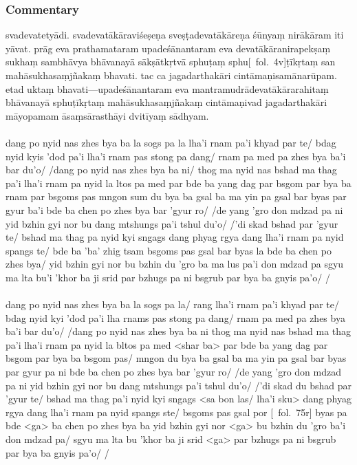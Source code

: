 \documentclass[12pt]{article}
\newcommand{\emdash} {\hspace{0em}—\hspace{0em}}
\begin{document}
\subsubsection{Commentary}
svadevatetyādi.
svadevatākāraviśeṣeṇa\footnoteB{
	svadevatā°] \sigmareading{\TVA}; lha \TVA\ (devatā°)
} sveṣṭadevatākāreṇa śūnyaṃ nirākāram iti yāvat.
prāg eva prathamataram\footnoteB{
	prathamataram] \MS ; prathamataro° \EDD
} upadeśānantaram\footnoteB{
	upadeśānantaram] \EDD\ (\emd); upadeśāntaram \MS
} eva devatākāranirapekṣaṃ sukhaṃ sambhāvya bhāvanayā sākṣātkṛtvā sphuṭaṃ\footnoteB{
	sphuṭaṃ] \MS ; \emph{deest in} \EDD ; ma gsal ba TIB 
} sphu[\MS\ fol.\ 4v]\hspace{0em}ṭīkṛtaṃ san mahāsukhasaṃjñakaṃ bhavati.
tac ca jagadarthakāri cintāmaṇisamānarūpam.
etad uktaṃ bhavati\emdash upadeśānantaram eva mantramudrādevatākārarahitaṃ\footnoteB{
	°rahitaṃ] \sigmareading{\TVA}; spangs te/ bde ba 'ba' zhig tsam \TVA\ (°rahitaṃ sukhamātraṃ)
} bhāvanayā sphuṭīkṛtaṃ mahāsukhasaṃjñakaṃ cintāmaṇivad jagadarthakāri māyopamam āsaṃsārasthāyi dvitīyaṃ sādhyam.\\

\textbf{\TVA}\\
dang po nyid nas zhes bya ba la sogs pa la lha'i rnam pa'i khyad par te/ bdag nyid kyis 'dod pa'i lha'i rnam pas stong pa dang/ rnam pa med pa zhes bya ba'i bar du'o/ /dang po nyid nas zhes bya ba ni/ thog ma nyid nas bshad ma thag pa'i lha'i rnam pa nyid la ltos pa med par bde ba yang dag par bsgom par bya ba rnam par bsgoms pas mngon sum du bya ba gsal ba ma yin pa gsal bar byas par gyur ba'i bde ba chen po zhes bya bar 'gyur ro/ /de yang 'gro don mdzad pa ni yid bzhin gyi nor bu dang mtshungs pa'i tshul du'o/ /'di skad bshad par 'gyur te/ bshad ma thag pa nyid kyi sngags dang phyag rgya dang lha'i rnam pa nyid spangs te/ bde ba 'ba' zhig tsam bsgoms pas gsal bar byas la bde ba chen po zhes bya/ yid bzhin gyi nor bu bzhin du 'gro ba ma lus pa'i don mdzad pa sgyu ma lta bu'i 'khor ba ji srid par bzhugs pa ni bsgrub par bya ba gnyis pa'o/ /\\

\textbf{\TVB}\\
dang po nyid nas zhes bya ba la sogs pa la/ rang lha'i rnam pa'i khyad par te/ bdag nyid kyi 'dod pa'i lha rnams pas stong pa dang/ rnam pa med pa zhes bya ba'i bar du'o/ /dang po nyid nas zhes bya ba ni thog ma nyid nas bshad ma thag pa'i lha'i rnam pa nyid la bltos pa med <shar ba> par bde ba yang dag par bsgom par bya ba bsgom pas/ mngon du bya ba gsal ba ma yin pa gsal bar byas par gyur pa ni bde ba chen po zhes bya bar 'gyur ro/ /de yang 'gro don mdzad pa ni yid bzhin gyi nor bu dang mtshungs pa'i tshul du'o/ /'di skad du bshad par 'gyur te/ bshad ma thag pa'i nyid kyi sngags <sa bon las/ lha'i sku> dang phyag rgya dang lha'i rnam pa nyid spangs ste/ bsgoms pas gsal por [\TVB\ fol.\ 75r] byas pa bde <ga> ba chen po zhes bya ba yid bzhin gyi nor <ga> bu bzhin du 'gro ba'i don mdzad pa/ sgyu ma lta bu 'khor ba ji srid <ga> par bzhugs pa ni bsgrub par bya ba gnyis pa'o/ /
\end{document}
